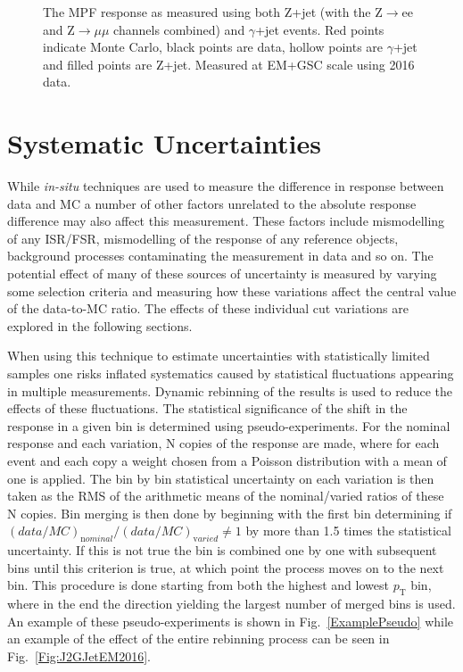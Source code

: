 \begin{figure}[!ht]
\begin{center}
\end{center}
\caption[Comparing EM scale response between Z+jet and $\gamma$+jet]
{\small The MPF response as measured using both Z+jet (with the Z$\rightarrow$ee and Z$\rightarrow\mu\mu$ channels combined) and $\gamma$+jet events.  Red points indicate Monte Carlo, black points are data, hollow points are $\gamma$+jet and filled points are Z+jet.  Measured at EM+GSC scale using 2016 data.   }
\label{GammaZCompare2016EM}
\end{figure}


\section{Systematic Uncertainties}

While \textit {in-situ} techniques are used to measure the difference in response between data and MC a number of other factors unrelated to the absolute response difference may also affect this measurement.  
These factors include mismodelling of any ISR/FSR, mismodelling of the response of any reference objects, background processes contaminating the measurement in data and so on.  
The potential effect of many of these sources of uncertainty is measured by varying some selection criteria and measuring how these variations affect the central value of the data-to-MC ratio.  
The effects of these individual cut variations are explored in the following sections.  

When using this technique to estimate uncertainties with statistically limited samples one risks inflated systematics caused by statistical fluctuations appearing in multiple measurements.  
Dynamic rebinning of the results is used to reduce the effects of these fluctuations.  
The statistical significance of the shift in the response in a given bin is determined using pseudo-experiments.  
For the nominal response and each variation, N copies of the response are made, where for each event and each copy a weight chosen from a Poisson distribution with a mean of one is applied.  
The bin by bin statistical uncertainty on each variation is then taken as the RMS of the arithmetic means of the nominal/varied ratios of these N copies.  
Bin merging is then done by beginning with the first bin determining if $\left(data/MC\right)_{\mathrm nominal}/\left(data/MC\right)_{\mathrm varied}\neq1$ by more than 1.5 times the statistical uncertainty.  
If this is not true the bin is combined one by one with subsequent bins until this criterion is true, at which point the process moves on to the next bin.  
This procedure is done starting from both the highest and lowest $p_{\mathrm T}$ bin, where in the end the direction yielding the largest number of merged bins is used.  
An example of these pseudo-experiments is shown in Fig.~\ref{ExamplePseudo} while an example of the effect of the entire rebinning process can be seen in Fig.~\ref{Fig:J2GJetEM2016}.  

